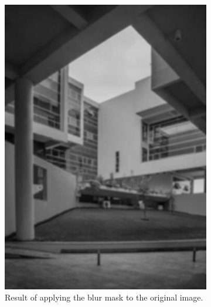 \documentclass[addpoints]{exam}
\begin{document}
\begin{figure}
\begin{subfigure}[c]{.31\textwidth}
    \includegraphics[width=\textwidth]{campus-blur}
    \caption{Result of applying the blur mask to the original image.}\label{fig:mask-blur}
  \end{subfigure}
  \begin{subfigure}[c]{.31\textwidth}

\end{subfigure}
\end{figure}
\end{document}
